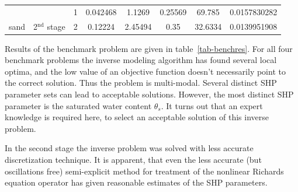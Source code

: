 \documentclass[review]{elsarticle}
\begin{document}
\begin{table}[]
\begin{small}
\begin{tabular}{|l|c|c|c|c|c|c|c|}
\multicolumn{1}{|c|}{}                       &                                         & 1                         & 0.042468                         & 1.1269                          & 0.25569                         & 69.785                          & 0.0157830282                                                                                                                    \\ \cline{3-8} 
\multicolumn{1}{|c|}{\multirow{-5}{*}{sand}} & \multirow{-2}{*}{2$^{\mbox{nd}}$ stage} & \cellcolor[HTML]{C0C0C0}2 & \cellcolor[HTML]{C0C0C0}0.12224  & \cellcolor[HTML]{C0C0C0}2.45494 & \cellcolor[HTML]{C0C0C0}0.35    & \cellcolor[HTML]{C0C0C0}32.6334 & \cellcolor[HTML]{C0C0C0}0.0139951908                                                                                            \\ \hline
\end{tabular}
\end{small}
\end{table}

Results of the benchmark problem are given in table~\ref{tab-benchres}. For all four benchmark problems the inverse modeling algorithm has found several local optima, and the low value of an objective function doesn't necessarily  point to the correct solution. Thus the problem is multi-modal. Several distinct SHP parameter sets can lead to acceptable solutions. However, the most distinct SHP parameter is the saturated water content $\theta_s$. It turns out that an expert knowledge is required here, to select an acceptable solution of this inverse problem.  

In the second stage the inverse problem was solved with less accurate discretization technique. It is apparent, that even the less accurate (but oscillations free) semi-explicit method for treatment of the nonlinear Richards equation operator has given  reasonable estimates of the SHP parameters. 


 

\end{document}
